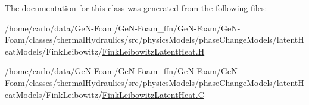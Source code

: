 The documentation for this class was generated from the following files\+:\begin{DoxyCompactItemize}
\item 
/home/carlo/data/\+Ge\+N-\/\+Foam/\+Ge\+N-\/\+Foam\+\_\+ffn/\+Ge\+N-\/\+Foam/\+Ge\+N-\/\+Foam/classes/thermal\+Hydraulics/src/physics\+Models/phase\+Change\+Models/latent\+Heat\+Models/\+Fink\+Leibowitz/\hyperlink{FinkLeibowitzLatentHeat_8H}{Fink\+Leibowitz\+Latent\+Heat.\+H}\item 
/home/carlo/data/\+Ge\+N-\/\+Foam/\+Ge\+N-\/\+Foam\+\_\+ffn/\+Ge\+N-\/\+Foam/\+Ge\+N-\/\+Foam/classes/thermal\+Hydraulics/src/physics\+Models/phase\+Change\+Models/latent\+Heat\+Models/\+Fink\+Leibowitz/\hyperlink{FinkLeibowitzLatentHeat_8C}{Fink\+Leibowitz\+Latent\+Heat.\+C}\end{DoxyCompactItemize}
